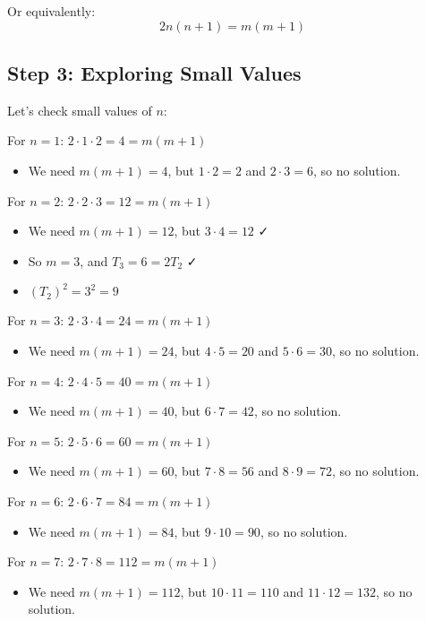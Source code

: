 \documentclass[12pt]{article}
\begin{document}
Or equivalently:
\begin{equation}
2n(n+1) = m(m+1)
\end{equation}

\subsection*{Step 3: Exploring Small Values}

Let's check small values of $n$:

For $n = 1$: $2 \cdot 1 \cdot 2 = 4 = m(m+1)$
\begin{itemize}
\item We need $m(m+1) = 4$, but $1 \cdot 2 = 2$ and $2 \cdot 3 = 6$, so no solution.
\end{itemize}

For $n = 2$: $2 \cdot 2 \cdot 3 = 12 = m(m+1)$
\begin{itemize}
\item We need $m(m+1) = 12$, but $3 \cdot 4 = 12$ ✓
\item So $m = 3$, and $T_3 = 6 = 2T_2$ ✓
\item $(T_2)^2 = 3^2 = 9$
\end{itemize}

For $n = 3$: $2 \cdot 3 \cdot 4 = 24 = m(m+1)$
\begin{itemize}
\item We need $m(m+1) = 24$, but $4 \cdot 5 = 20$ and $5 \cdot 6 = 30$, so no solution.
\end{itemize}

For $n = 4$: $2 \cdot 4 \cdot 5 = 40 = m(m+1)$
\begin{itemize}
\item We need $m(m+1) = 40$, but $6 \cdot 7 = 42$, so no solution.
\end{itemize}

For $n = 5$: $2 \cdot 5 \cdot 6 = 60 = m(m+1)$
\begin{itemize}
\item We need $m(m+1) = 60$, but $7 \cdot 8 = 56$ and $8 \cdot 9 = 72$, so no solution.
\end{itemize}

For $n = 6$: $2 \cdot 6 \cdot 7 = 84 = m(m+1)$
\begin{itemize}
\item We need $m(m+1) = 84$, but $9 \cdot 10 = 90$, so no solution.
\end{itemize}

For $n = 7$: $2 \cdot 7 \cdot 8 = 112 = m(m+1)$
\begin{itemize}
\item We need $m(m+1) = 112$, but $10 \cdot 11 = 110$ and $11 \cdot 12 = 132$, so no solution.
\end{itemize}
\end{document}
